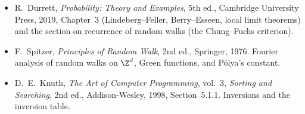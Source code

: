 \begin{itemize}
Edgeworth expansions; our Lemmas~\ref{lem:smoothing} and~\ref{lem:cfestimate} follow it.
\item R.~Durrett, \emph{Probability: Theory and Examples}, 5th ed., Cambridge University Press, 2019, Chapter~3 (Lindeberg--Feller, Berry--Esseen,
local limit theorems) and the section on recurrence of random walks (the Chung--Fuchs criterion).
\item F.~Spitzer, \emph{Principles of Random Walk}, 2nd ed., Springer, 1976. Fourier analysis of random walks on $\Z^d$, Green functions, and P\'olya's constant.
\item D.~E.~Knuth, \emph{The Art of Computer Programming}, vol.~3, \emph{Sorting and Searching}, 2nd ed., Addison-Wesley, 1998, Section~5.1.1. Inversions and
the inversion table.
\end{itemize}
